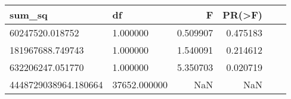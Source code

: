 \begin{tabular}{llrrrr}
\toprule
sum\_sq & df & F & PR(>F) \\
\midrule
60247520.018752 & 1.000000 & 0.509907 & 0.475183 \\
181967688.749743 & 1.000000 & 1.540091 & 0.214612 \\
632206247.051770 & 1.000000 & 5.350703 & 0.020719 \\
4448729038964.180664 & 37652.000000 & NaN & NaN \\
\bottomrule
\end{tabular}
